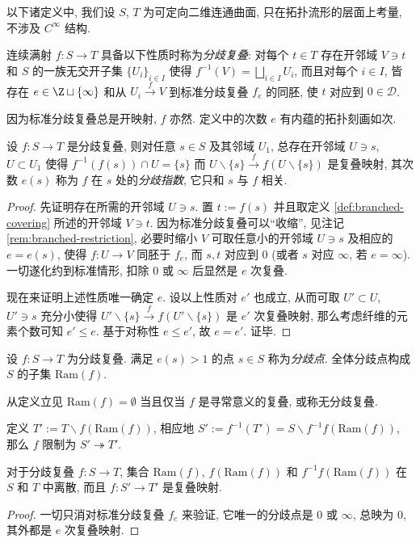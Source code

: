 以下诸定义中, 我们设 $S$, $T$ 为可定向二维连通曲面, 只在拓扑流形的层面上考量, 不涉及 $C^\infty$ 结构.
\begin{definition}\label{def:branched-covering}
	连续满射 $f: S \to T$ 具备以下性质时称为\emph{分歧复叠}: 对每个 $t \in T$ 存在开邻域 $V \ni t$ 和 $S$ 的一族无交开子集 $\{U_i \}_{i \in I}$ 使得 $f^{-1}(V) = \bigsqcup_{i \in I} U_i$, 而且对每个 $i \in I$, 皆存在 $e \in \Z \sqcup \{\infty\}$ 和从 $U_i \xrightarrow{f} V$ 到标准分歧复叠 $f_e$ 的同胚, 使 $t$ 对应到 $0 \in \mathcal{D}$.
\end{definition}

因为标准分歧复叠总是开映射, $f$ 亦然. 定义中的次数 $e$ 有内蕴的拓扑刻画如次.

\begin{definition-theorem}\label{def-prop:ramification-index}
	设 $f: S \to T$ 是分歧复叠, 则对任意 $s \in S$ 及其邻域 $U_1$, 总存在开邻域 $U \ni s$, $U \subset U_1$ 使得 $f^{-1}(f(s)) \cap U = \{s\}$ 而 $U \smallsetminus \{s\} \xrightarrow{f} f(U \smallsetminus \{s\})$ 是复叠映射, 其次数 $e(s)$ 称为 $f$ 在 $s$ 处的\emph{分歧指数}, 它只和 $s$ 与 $f$ 相关.
\end{definition-theorem}
\begin{proof}
	先证明存在所需的开邻域 $U \ni s$. 置 $t := f(s)$ 并且取定义 \ref{def:branched-covering} 所述的开邻域 $V \ni t$. 因为标准分歧复叠可以``收缩'', 见注记 \ref{rem:branched-restriction}, 必要时缩小 $V$ 可取任意小的开邻域 $U \ni s$ 及相应的 $e = e(s)$, 使得 $f: U \to V$ 同胚于 $f_e$, 而 $s, t$ 对应到 $0$ (或者 $s$ 对应 $\infty$, 若 $e = \infty$). 一切遂化约到标准情形, 扣除 $0$ 或 $\infty$ 后显然是 $e$ 次复叠.

	现在来证明上述性质唯一确定 $e$. 设以上性质对 $e'$ 也成立, 从而可取 $U' \subset U$, $U' \ni s$ 充分小使得 $U' \smallsetminus \{s\} \xrightarrow{f} f(U' \smallsetminus \{s\})$ 是 $e'$ 次复叠映射, 那么考虑纤维的元素个数可知 $e' \leq e$. 基于对称性 $e \leq e'$, 故 $e = e'$. 证毕.
\end{proof}

\begin{definition}\label{def:Ram}
	设 $f: S \to T$ 为分歧复叠. 满足 $e(s) > 1$ 的点 $s \in S$ 称为\emph{分歧点}. 全体分歧点构成 $S$ 的子集 $\mathrm{Ram}(f)$.
\end{definition}

从定义立见 $\mathrm{Ram}(f) = \emptyset$ 当且仅当 $f$ 是寻常意义的复叠, 或称无分歧复叠.

定义 $T' := T \smallsetminus f(\mathrm{Ram}(f))$, 相应地 $S' := f^{-1}(T') = S \smallsetminus f^{-1}f(\mathrm{Ram}(f))$, 那么 $f$ 限制为 $S' \twoheadrightarrow T'$.
\begin{proposition}\label{prop:ramified-covering-unramified}
	对于分歧复叠 $f: S \to T$, 集合 $\mathrm{Ram}(f)$, $f(\mathrm{Ram}(f))$ 和 $f^{-1}f(\mathrm{Ram}(f))$ 在 $S$ 和 $T$ 中离散, 而且 $f: S' \to T'$ 是复叠映射.
\end{proposition}
\begin{proof}
	一切只消对标准分歧复叠 $f_e$ 来验证, 它唯一的分歧点是 $0$ 或 $\infty$, 总映为 $0$, 其外都是 $e$ 次复叠映射.
\end{proof}

